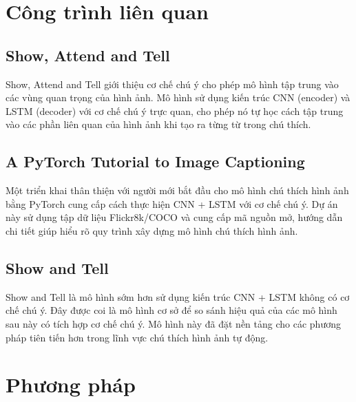 \documentclass[conference]{IEEEtran}
\begin{document}
\section{Công trình liên quan}

\subsection{Show, Attend and Tell}
Show, Attend and Tell \cite{show_attend_tell} giới thiệu cơ chế chú ý cho phép mô hình tập trung vào các vùng quan trọng của hình ảnh. Mô hình sử dụng kiến trúc CNN (encoder) và LSTM (decoder) với cơ chế chú ý trực quan, cho phép nó tự học cách tập trung vào các phần liên quan của hình ảnh khi tạo ra từng từ trong chú thích.

\subsection{A PyTorch Tutorial to Image Captioning}
Một triển khai thân thiện với người mới bắt đầu cho mô hình chú thích hình ảnh bằng PyTorch \cite{pytorch_tutorial} cung cấp cách thực hiện CNN + LSTM với cơ chế chú ý. Dự án này sử dụng tập dữ liệu Flickr8k/COCO và cung cấp mã nguồn mở, hướng dẫn chi tiết giúp hiểu rõ quy trình xây dựng mô hình chú thích hình ảnh.

\subsection{Show and Tell}
Show and Tell \cite{show_tell} là mô hình sớm hơn sử dụng kiến trúc CNN + LSTM không có cơ chế chú ý. Đây được coi là mô hình cơ sở để so sánh hiệu quả của các mô hình sau này có tích hợp cơ chế chú ý. Mô hình này đã đặt nền tảng cho các phương pháp tiên tiến hơn trong lĩnh vực chú thích hình ảnh tự động.


\section{Phương pháp}
\end{document}
